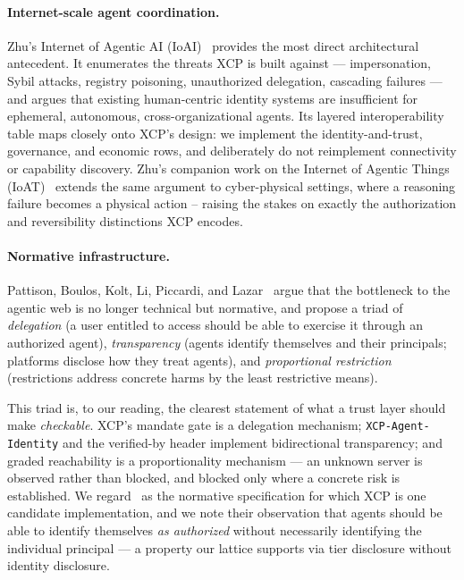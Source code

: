 \documentclass[11pt]{article}
\begin{document}
\paragraph{Internet-scale agent coordination.}
Zhu's Internet of Agentic AI (IoAI)~\cite{zhu2026ioai} provides the most direct
architectural antecedent. It enumerates the threats XCP is built against ---
impersonation, Sybil attacks, registry poisoning, unauthorized delegation,
cascading failures --- and argues that existing human-centric identity systems
are insufficient for ephemeral, autonomous, cross-organizational agents. Its
layered interoperability table maps closely onto XCP's design: we implement the
identity-and-trust, governance, and economic rows, and deliberately do not
reimplement connectivity or capability discovery. Zhu's companion work on the
Internet of Agentic Things (IoAT)~\cite{zhu2026ioat} extends the same argument to
cyber-physical settings, where a reasoning failure becomes a physical action --
raising the stakes on exactly the authorization and reversibility distinctions
XCP encodes.

\paragraph{Normative infrastructure.}
Pattison, Boulos, Kolt, Li, Piccardi, and Lazar~\cite{pattison2026} argue that
the bottleneck to the agentic web is no longer technical but normative, and
propose a triad of \emph{delegation} (a user entitled to access should be able to
exercise it through an authorized agent), \emph{transparency} (agents identify
themselves and their principals; platforms disclose how they treat agents), and
\emph{proportional restriction} (restrictions address concrete harms by the least
restrictive means).

This triad is, to our reading, the clearest statement of what a trust layer
should make \emph{checkable}. XCP's mandate gate is a delegation mechanism;
\texttt{XCP-Agent-Identity} and the verified-by header implement bidirectional
transparency; and graded reachability is a proportionality mechanism --- an
unknown server is observed rather than blocked, and blocked only where a concrete
risk is established. We regard~\cite{pattison2026} as the normative specification
for which XCP is one candidate implementation, and we note their observation that
agents should be able to identify themselves \emph{as authorized} without
necessarily identifying the individual principal --- a property our lattice
supports via tier disclosure without identity disclosure.
\end{document}
